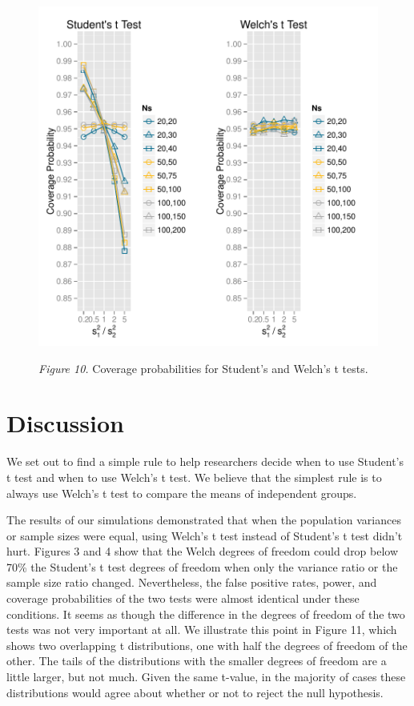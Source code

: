 \documentclass[man,a4paper,noextraspace,apacite]{apa6}
\begin{document}
\begin{figure}
\includegraphics{WelchManuscript-abridged-coverageplots}

\textit{Figure 10.} Coverage probabilities for Student's and Welch's t tests.
\end{figure}

\section{Discussion}
    We set out to find a simple rule to help researchers decide when to use Student's t test and when to use Welch's t test. We believe that the simplest rule is to always use Welch's t test to compare the means of independent groups.
    
    The results of our simulations demonstrated that when the population variances or sample sizes were equal, using Welch's t test instead of Student's t test didn't hurt. Figures 3 and 4 show that the Welch degrees of freedom could drop below 70\% the Student's t test degrees of freedom when only the variance ratio or the sample size ratio changed. Nevertheless, the false positive rates, power, and coverage probabilities of the two tests were almost identical under these conditions. It seems as though the difference in the degrees of freedom of the two tests was not very important at all. We illustrate this point in Figure 11, which shows two overlapping t distributions, one with half the degrees of freedom of the other. The tails of the distributions with the smaller degrees of freedom are a little larger, but not much. Given the same t-value, in the majority of cases these distributions would agree about whether or not to reject the null hypothesis. 
    
\end{document}
